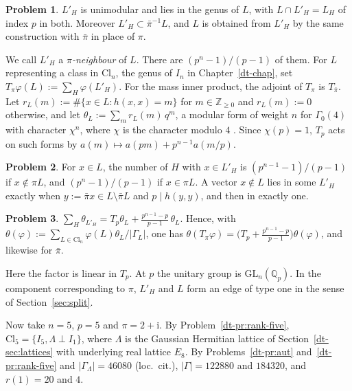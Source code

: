 \documentclass[reqno]{amsart}
\newcounter{chap}
\theoremstyle{definition}
\newtheorem{problem}{Problem}[section]
\theoremstyle{plain}
\newcommand{\Z}{\mathbb{Z}}
\newcommand{\Q}{\mathbb{Q}}
\newcommand{\ii}{\mathrm{i}}
\newcommand{\Cl}{\mathrm{Cl}}
\begin{document}
\begin{problem}\label{pr:herm-nb}
\(L'_H\) is unimodular and lies in the genus of \(L\), with \(L \cap L'_H = L_H\) of index \(p\) in both.  Moreover \(L'_H \subset \bar\pi^{-1}L\), and \(L\) is obtained from \(L'_H\) by the same construction with \(\bar\pi\) in place of \(\pi\).
\end{problem}

We call \(L'_H\) a \emph{\(\pi\)-neighbour} of \(L\).  There are \((p^n-1)/(p-1)\) of them.  For \(L\) representing a class in \(\Cl_n\), the genus of \(I_n\) in Chapter~\ref{dt-chap}, set \(T_\pi\varphi(L):=\sum_H\varphi(L'_H)\).  For the mass inner product, the adjoint of \(T_\pi\) is \(T_{\bar\pi}\).  Let \(r_L(m):=\#\{x\in L:h(x,x)=m\}\) for \(m\in\Z_{\ge0}\) and \(r_L(m):=0\) otherwise, and let \(\theta_L := \sum_m r_L(m)\, q^m\), a modular form of weight \(n\) for \(\Gamma_0(4)\) with character \(\chi^n\), where \(\chi\) is the character modulo \(4\) \cite[Ch.~10]{Iw}.  Since \(\chi(p) = 1\), \(T_p\) acts on such forms by \(a(m) \mapsto a(pm) + p^{n-1}a(m/p)\).

\begin{problem}\label{pr:herm-count}
For \(x \in L\), the number of \(H\) with \(x \in L'_H\) is \((p^{n-1}-1)/(p-1)\) if \(x \notin \pi L\), and \((p^n - 1)/(p - 1)\) if \(x \in \pi L\).  A vector \(x \notin L\) lies in some \(L'_H\) exactly when \(y := \bar\pi x \in L \setminus \bar\pi L\) and \(p \mid h(y,y)\), and then in exactly one.
\end{problem}

\begin{problem}\label{pr:herm-eichler}
\(\displaystyle \sum_H \theta_{L'_H} = T_p\theta_L + \frac{p^{n-1} - p}{p - 1}\,\theta_L\).  Hence, with \(\theta(\varphi) := \sum_{L \in \Cl_n} \varphi(L)\theta_L/\lvert\Gamma_L\rvert\), one has \(\theta(T_\pi\varphi) = \bigl(T_p + \frac{p^{n-1}-p}{p-1}\bigr)\theta(\varphi)\), and likewise for \(\bar\pi\).
\end{problem}

Here the factor is linear in \(T_p\).  At \(p\) the unitary group is \(\mathrm{GL}_n(\Q_p)\).  In the component corresponding to \(\pi\), \(L'_H\) and \(L\) form an edge of type one in the sense of Section~\ref{sec:split}.

Now take \(n = 5\), \(p = 5\) and \(\pi = 2 + \ii\).  By Problem~\ref{dt-pr:rank-five}, \(\Cl_5 = \{I_5, \Lambda \perp I_1\}\), where \(\Lambda\) is the Gaussian Hermitian lattice of Section~\ref{dt-sec:lattices} with underlying real lattice \(E_8\).  By Problems~\ref{dt-pr:aut} and~\ref{dt-pr:rank-five} and \(\lvert\Gamma_\Lambda\rvert = 46080\) (loc.\ cit.), \(\lvert\Gamma\rvert = 122880\) and \(184320\), and \(r(1) = 20\) and \(4\).
\end{document}
